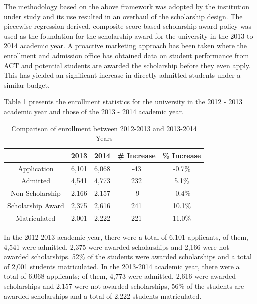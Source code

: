 \documentclass[12pt,english]{report}
\begin{document}
The methodology based on the above framework was adopted by the institution under study and its use resulted in an overhaul of the scholarship design. The piecewise regression derived, composite score based scholarship award policy was used as the foundation for the scholarship award for the university in the 2013 to 2014 academic year. A proactive marketing approach has been taken where the enrollment and admission office has obtained data on student performance from ACT and potential students are awarded the scholarship before they even apply. This has yielded an significant increase in directly admitted students under a similar budget. 

Table \ref{enroll_stats1} presents the enrollment statistics for the university in the 2012 - 2013 academic year and those of the 2013 - 2014 academic year.

\begin{table}[H]
\centering
\begin{tabular}{|c|c|c|c|c|}
\hline
& 2013 & 2014 & \# Increase & \% Increase \\ \hline
Application                    & 6,101 & 6,068 & -43         & -0.7\%      \\ \hline
Admitted                       & 4,541 & 4,773 & 232         & 5.1\%       \\ \hline
Non-Scholarship                & 2,166 & 2,157 & -9          & -0.4\%      \\ \hline
Scholarship Award              & 2,375 & 2,616 & 241         & 10.1\%      \\ \hline
Matriculated                   & 2,001 & 2,222 & 221         & 11.0\%      \\ \hline
\end{tabular}
\caption{ Comparison of enrollment between 2012-2013 and 2013-2014 Years}
\label{enroll_stats1}
\end{table}

In the 2012-2013 academic year, there were a total of 6,101 applicants, of them, 4,541 were admitted. 2,375 were awarded scholarships and 2,166 were not awarded scholarships. 52\% of the students were awarded scholarships and a total of 2,001 students matriculated. In the 2013-2014 academic year, there were a total of 6,068 applicants; of them, 4,773 were admitted, 2,616 were awarded scholarships and 2,157 were not awarded scholarships, 56\% of the students are awarded scholarships and a total of 2,222 students matriculated.
\end{document}
